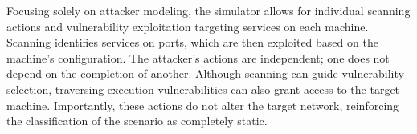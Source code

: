 




Focusing solely on attacker modeling, the simulator allows for individual scanning actions and vulnerability exploitation targeting services on each machine. Scanning identifies services on ports, which are then exploited based on the machine's configuration. The attacker's actions are independent; one does not depend on the completion of another. Although scanning can guide vulnerability selection, traversing execution vulnerabilities can also grant access to the target machine. Importantly, these actions do not alter the target network, reinforcing the classification of the scenario as completely static.

